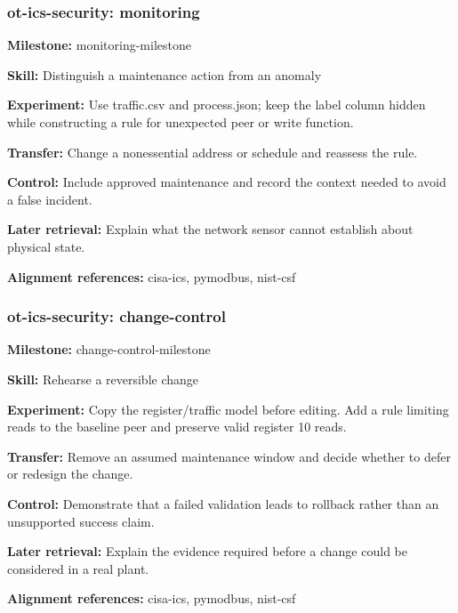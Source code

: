 \subsubsection{ot-ics-security: monitoring}
\noindent\textbf{Milestone:} monitoring-milestone\par
\noindent\textbf{Skill:} Distinguish a maintenance action from an anomaly\par
\noindent\textbf{Experiment:} Use traffic.csv and process.json; keep the label column hidden while constructing a rule for unexpected peer or write function.\par
\noindent\textbf{Transfer:} Change a nonessential address or schedule and reassess the rule.\par
\noindent\textbf{Control:} Include approved maintenance and record the context needed to avoid a false incident.\par
\noindent\textbf{Later retrieval:} Explain what the network sensor cannot establish about physical state.\par
\noindent\textbf{Alignment references:} cisa-ics, pymodbus, nist-csf\par
\subsubsection{ot-ics-security: change-control}
\noindent\textbf{Milestone:} change-control-milestone\par
\noindent\textbf{Skill:} Rehearse a reversible change\par
\noindent\textbf{Experiment:} Copy the register/traffic model before editing. Add a rule limiting reads to the baseline peer and preserve valid register 10 reads.\par
\noindent\textbf{Transfer:} Remove an assumed maintenance window and decide whether to defer or redesign the change.\par
\noindent\textbf{Control:} Demonstrate that a failed validation leads to rollback rather than an unsupported success claim.\par
\noindent\textbf{Later retrieval:} Explain the evidence required before a change could be considered in a real plant.\par
\noindent\textbf{Alignment references:} cisa-ics, pymodbus, nist-csf\par
